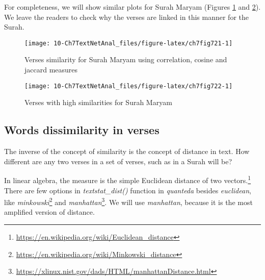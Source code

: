 \documentclass[
]{article}
\begin{document}
For completeness, we will show similar plots for Surah Maryam (Figures \ref{fig:ch7fig721} and \ref{fig:ch7fig722}). We leave the readers to check why the verses are linked in this manner for the Surah.

\begin{figure}

{\centering \texttt{[image: 10-Ch7TextNetAnal\_files/figure-latex/ch7fig721-1]} 

}

\caption{Verses similarity for Surah Maryam using correlation, cosine and jaccard measures}\label{fig:ch7fig721}
\end{figure}

\begin{figure}

{\centering \texttt{[image: 10-Ch7TextNetAnal\_files/figure-latex/ch7fig722-1]} 

}

\caption{Verses with high similarities for Surah Maryam}\label{fig:ch7fig722}
\end{figure}

\hypertarget{words-dissimilarity-in-verses}{%
\subsection{Words dissimilarity in verses}\label{words-dissimilarity-in-verses}}

The inverse of the concept of similarity is the concept of distance in text. How different are any two verses in a set of verses, such as in a Surah will be?

In linear algebra, the measure is the simple Euclidean distance of two vectors.\footnote{\url{https://en.wikipedia.org/wiki/Euclidean_distance}} There are few options in \emph{textstat\_dist()} function in \emph{quanteda} besides \emph{euclidean}, like \emph{minkowski}\footnote{\url{https://en.wikipedia.org/wiki/Minkowski_distance}} and \emph{manhattan}\footnote{\url{https://xlinux.nist.gov/dads/HTML/manhattanDistance.html}}. We will use \emph{manhattan}, because it is the most amplified version of distance.
\end{document}
